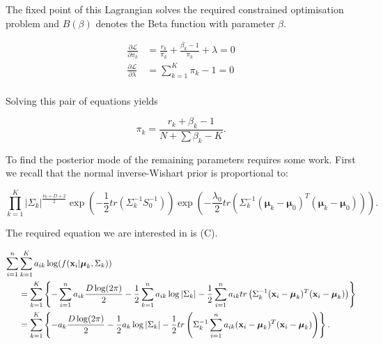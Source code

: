 \documentclass[12pt,english]{article}\usepackage[]{graphicx}\usepackage[]{color}
\begin{document}
The fixed point of this Lagrangian solves the required constrained
optimisation problem and $B(\beta)$ denotes the Beta function with
parameter $\beta$.

\begin{equation}
\begin{split}
\frac{\partial\mathcal{L}}{\partial \pi_k} &= \frac{r_k}{\pi_k} + \frac{\beta_k - 1}{\pi_k} + \lambda = 0\\
\frac{\partial\mathcal{L}}{\partial \lambda} &= \sum_{k=1}^{K}\pi_k - 1 = 0\\
\end{split}
\end{equation}

Solving this pair of equations yields

\begin{equation}
\pi_k = \frac{r_k + \beta_k - 1}{N + \sum \beta_k - K}.
\end{equation}

To find the posterior mode of the remaining parameters requires some
work.  First we recall that the normal inverse-Wishart prior is
proportional to:

\begin{equation}
\prod_{k=1}^{K}|\Sigma_{k}|^{\frac{\nu_0 + D + 2}{2}}\exp \left(-\frac{1}{2}tr(\Sigma_{k}^{-1}S_0^{-1})\right)\exp \left(-\frac{\lambda_0}{2}tr(\Sigma_{k}^{-1}(\boldsymbol{\mu}_k - \boldsymbol{\mu}_0)^{T}(\boldsymbol{\mu}_k - \boldsymbol{\mu}_0))\right).
\end{equation}

The required equation we are interested in is (C).

\begin{equation}
\begin{split}
\sum_{i=1}^{n} &\sum_{k=1}^{K}a_{ik}\log (f({\bf x}_i|\boldsymbol{\mu}_k, \Sigma_k))\\
& = \sum_{k=1}^{K}\left\{- \sum_{i=1}^{n} a_{ik}\frac{D\log(2\pi)}{2} - \frac{1}{2}\sum_{k=1}^{n}a_{ik}\log|\Sigma_{k}| - \frac{1}{2}\sum_{i=1}^{n}a_{ik}tr\left(\Sigma_{k}^{-1}({\bf x}_i - \boldsymbol{\mu}_k)^{T}({\bf x}_i - \boldsymbol{\mu}_k)\right)\right\}\\
& = \sum_{k=1}^{K}\left\{- a_k\frac{D\log(2\pi)}{2} - \frac{1}{2}a_k\log|\Sigma_{k}| - \frac{1}{2}tr\left(\Sigma_{k}^{-1}\sum_{i=1}^{n}a_{ik}({\bf x}_i - \boldsymbol{\mu}_k)^{T}({\bf x}_i - \boldsymbol{\mu}_k)\right)\right\}.
\end{split}
\end{equation}
\end{document}
